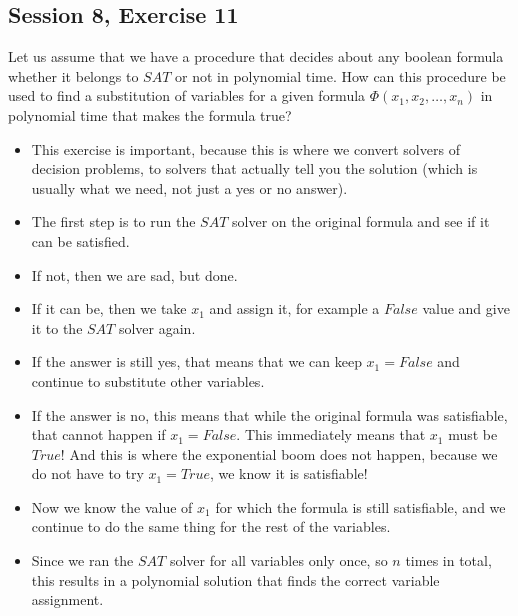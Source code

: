 \subsection {Session 8, Exercise 11}
\label{8_11}


Let us assume that we have a procedure that decides about any boolean formula whether it belongs to $SAT$
or not in polynomial time. How can this procedure be used to find a substitution of variables for a given
formula $\Phi(x_1,x_2, \dots{},x_n)$ in polynomial time that makes the formula true?


\begin{itemize}
    \item This exercise is important, because this is where we convert solvers of decision problems, to solvers that actually tell you the solution (which is usually what we need, not just a yes or no answer).
    \item The first step is to run the $SAT$ solver on the original formula and see if it can be satisfied.
    \item If not, then we are sad, but done.
    \item If it can be, then we take $x_1$ and assign it, for example a $False$ value and give it to the $SAT$ solver again.
    \item If the answer is still yes, that means that we can keep $x_1 = False$ and continue to substitute other variables.
    \item If the answer is no, this means that while the original formula was satisfiable, that cannot happen if $x_1 = False$. This immediately means that $x_1$ must be $True$! And this is where the exponential boom does not happen, because we do not have to try $x_1 = True$, we know it is satisfiable!
    \item Now we know the value of $x_1$ for which the formula is still satisfiable, and we continue to do the same thing for the rest of the variables.
    \item Since we ran the $SAT$ solver for all variables only once, so $n$ times in total, this results in a polynomial solution that finds the correct variable assignment.
\end{itemize}